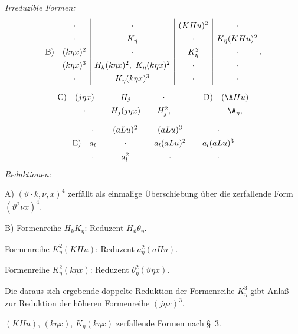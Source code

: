 \noindent\emph{Irreduzible Formen:}
\[
\renewcommand{\arraystretch}{1.35}
\begin{array}{@{}r@{\quad}c|c|c|c@{}}
&\cdot&\cdot&(KHu)^2&\cdot\\
&\cdot&K_\eta&\cdot&K_\eta(KHu)^2\\
\text{B)}&(k\eta x)^2&\cdot&K_\eta^2&\cdot\\
&(k\eta x)^3&H_k(k\eta x)^2,\ K_\eta(k\eta x)^2&\cdot&\cdot\\
&\cdot&K_\eta(k\eta x)^3&\cdot&\cdot
\end{array}\, ,
\]
\[
\renewcommand{\arraystretch}{1.35}
\begin{array}{@{}r@{\quad}c@{\qquad}c@{\qquad}c@{\qquad\qquad}r@{\quad}c@{}}
\text{C)}&(j\eta x)&H_j&\cdot&\text{D)}&(\A Hu)\\
&\cdot&H_j(j\eta x)&H_j^2,&&\A_\eta,
\end{array}
\]
\[
\renewcommand{\arraystretch}{1.35}
\begin{array}{@{}r@{\quad}c@{\qquad}c@{\qquad}c@{\qquad}c@{}}
&\cdot&(aLu)^2&(aLu)^3&\cdot\\
\text{E)}&a_l&\cdot&a_l(aLu)^2&a_l(aLu)^3\\
&\cdot&a_l^2&\cdot&\cdot
\end{array}
\]
\noindent\emph{Reduktionen:}

\noindent A) $(\vartheta\cdot k,\nu,x)^4$ zerfällt als einmalige Überschiebung über die zerfallende Form $(\vartheta^2\nu x)^4$.

\noindent B) Formenreihe $H_kK_\eta$: Reduzent $H_\vartheta\theta_\eta$.

Formenreihe $K_\eta^2(KHu)$: Reduzent $a_\eta^2(aHu)$.

Formenreihe $K_\eta^2(k\eta x)$: Reduzent $\theta_\eta^2(\vartheta\eta x)$.

Die daraus sich ergebende doppelte Reduktion der Formenreihe $K_\eta^3$ gibt Anlaß zur Reduktion der höheren Formenreihe $(j\eta x)^3$.

$(KHu)$, $(k\eta x)$, $K_\eta(k\eta x)$ zerfallende Formen nach \S\ 3.

